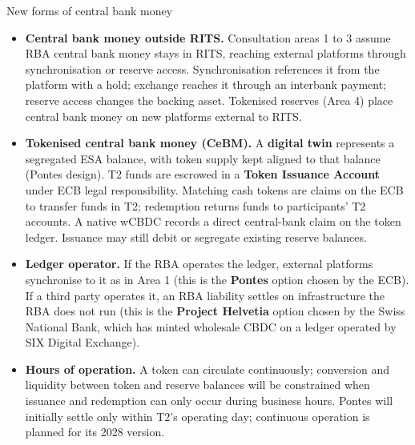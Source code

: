 \documentclass[aspectratio=169,12pt]{beamer}
\makeatletter
\newcommand{\rust}[1]{{\color{Rust}\bfseries\fontsize{\dimexpr\f@size pt+0.7pt\relax}{\f@baselineskip}\selectfont #1}}
\makeatother
\begin{document}
\begin{frame}[t]{New forms of central bank money}
\fontsize{8.0}{10.0}\selectfont
\vspace{-0.1em}
  \vspace{0pt plus 0.35fill}\begin{itemize}\setlength{\itemsep}{2pt plus 2.4fill}
    \item \rust{Central bank money outside RITS.} Consultation areas 1 to 3 assume RBA central bank money stays in RITS, reaching external platforms through synchronisation or reserve access. Synchronisation references it from the platform with a hold; exchange reaches it through an interbank payment; reserve access changes the backing asset. Tokenised reserves (Area 4) place central bank money on new platforms external to RITS.
    \item \rust{Tokenised central bank money (CeBM).} A \textbf{digital twin} represents a segregated ESA balance, with token supply kept aligned to that balance (Pontes design). T2 funds are escrowed in a \textbf{Token Issuance Account} under ECB legal responsibility. Matching cash tokens are claims on the ECB to transfer funds in T2; redemption returns funds to participants' T2 accounts. A native wCBDC records a direct central-bank claim on the token ledger. Issuance may still debit or segregate existing reserve balances.
    \item \rust{Ledger operator.} If the RBA operates the ledger, external platforms synchronise to it as in Area 1 (this is the \textbf{Pontes} option chosen by the ECB). If a third party operates it, an RBA liability settles on infrastructure the RBA does not run (this is the \textbf{Project Helvetia} option chosen by the Swiss National Bank, which has minted wholesale CBDC on a ledger operated by SIX Digital Exchange).
    \item \rust{Hours of operation.} A token can circulate continuously; conversion and liquidity between token and reserve balances will be constrained when issuance and redemption can only occur during business hours. Pontes will initially settle only within T2's operating day; continuous operation is planned for its 2028 version.
  \end{itemize}\vspace{0pt plus 4fill}
\end{frame}
\end{document}
